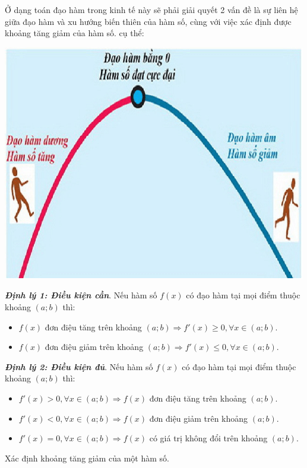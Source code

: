 \documentclass[12pt,a4paper]{report}
\begin{document}
Ở dạng toán đạo hàm trong kinh tế này sẽ phải giải quyết 2 vấn đề là sự liên hệ giữa đạo hàm và xu hướng biến thiên của hàm số, cùng với việc xác định được khoảng tăng giảm của hàm số. cụ thể:
\begin{center}
    \includegraphics*[scale = 0.8]{4.png}
\end{center}

\textit{\textbf{Định lý 1: Điều kiện cần}}. Nếu hàm số $f(x)$ có đạo hàm tại mọi điểm thuộc khoảng $(a;b)$ thì:
\begin{itemize}
    \item $f(x)$ đơn điệu tăng trên khoảng $(a;b) \Rightarrow f'(x) \geq 0, \forall x \in (a;b)$.
    \item $f(x)$ đơn điệu giảm trên khoảng $(a;b) \Rightarrow f'(x) \leq 0, \forall x \in (a;b)$.
\end{itemize}

\textit{\textbf{Định lý 2: Điều kiện đủ}}. Nếu hàm số $f(x)$ có đạo hàm tại mọi điểm thuộc khoảng $(a;b)$ thì:
\begin{itemize}
    \item $f'(x) > 0, \forall x \in (a;b) \Rightarrow f(x)$ đơn điệu tăng trên khoảng $(a;b)$.
    \item $f'(x) < 0, \forall x \in (a;b) \Rightarrow f(x)$ đơn điệu giảm trên khoảng $(a;b)$.
    \item $f'(x) = 0, \forall x \in (a;b) \Rightarrow f(x)$ có giá trị không đổi trên khoảng $(a;b)$.
\end{itemize}

Xác định khoảng tăng giảm của một hàm số.
\end{document}
